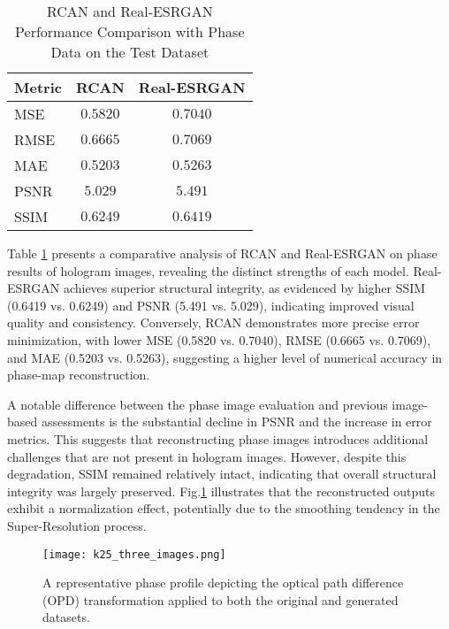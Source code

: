 \documentclass[10pt,twocolumn]{article}
\begin{document}
\begin{table}[ht]
\caption{RCAN and Real-ESRGAN Performance Comparison with Phase Data on the Test Dataset}
\centering
\vspace{+0.2cm}
\begin{tabular}{>{\RaggedRight\arraybackslash}p{2.5cm} *{2}{c}}
\toprule
\textbf{Metric} & \textbf{RCAN} & \textbf{Real-ESRGAN} \\
\midrule
MSE & $\num{0.5820}$ & $\num{0.7040}$ \\
RMSE & $\num{0.6665}$ & $\num{0.7069}$ \\
MAE & $\num{0.5203}$ & $\num{0.5263}$ \\
PSNR & $\num{5.029}$ & $\num{5.491}$ \\
SSIM & $\num{0.6249}$ & $\num{0.6419}$ \\
\bottomrule
\end{tabular}
\label{tab:model_performance}
\end{table}

Table \ref{tab:model_performance} presents a comparative analysis of RCAN and Real-ESRGAN on phase results of hologram images, revealing the distinct strengths of each model. Real-ESRGAN achieves superior structural integrity, as evidenced by higher SSIM (0.6419 vs. 0.6249) and PSNR (5.491 vs. 5.029), indicating improved visual quality and consistency. Conversely, RCAN demonstrates more precise error minimization, with lower MSE (0.5820 vs. 0.7040), RMSE (0.6665 vs. 0.7069), and MAE (0.5203 vs. 0.5263), suggesting a higher level of numerical accuracy in phase-map reconstruction.

A notable difference between the phase image evaluation and previous image-based assessments is the substantial decline in PSNR and the increase in error metrics. This suggests that reconstructing phase images introduces additional challenges that are not present in hologram  images. However, despite this degradation, SSIM remained relatively intact, indicating that overall structural integrity was largely preserved.  Fig.\ref{fig:graph} illustrates that the reconstructed outputs exhibit a normalization effect, potentially due to the smoothing tendency in the Super-Resolution process.

\begin{figure}[ht]
    \centering
    \vspace{-0.3cm}
    \texttt{[image: k25\_three\_images.png]}
    \vspace{-0.8cm}
    \caption{\centering A representative phase profile depicting the optical path difference (OPD) transformation applied to both the original and generated datasets. }
    \label{fig:graph}
\end{figure}
\end{document}
